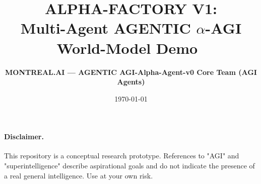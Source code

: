\usepackage{amsmath,amsfonts,amssymb,amsthm,bm,physics}
\usepackage[dvipsnames]{xcolor}
\usepackage{graphicx,tikz,pgfplots}
  \pgfplotsset{compat=1.18}
  \usetikzlibrary{positioning,calc}
\usepackage{minted}                 %


\usepackage{hyperref}
  \hypersetup{colorlinks,allcolors=RoyalBlue}

\usepackage{booktabs,multirow}
\usepackage[inline]{enumitem}                       %
\usepackage{caption}
  \captionsetup{labelfont=bf}

\usepackage{algorithm}
\usepackage{algpseudocode}

\usepackage[
  backend=biber,
  style=authoryear,
  maxbibnames=3,
  sorting=nyt
]{biblatex}
  

\newtheorem{theorem}{Theorem}[section]
\newtheorem{lemma}{Lemma}[section]

\title{\bfseries ALPHA-FACTORY V1:\\
  Multi-Agent AGENTIC \boldmath$\alpha$-AGI World-Model Demo
  \texorpdfstring{\,}{}}
\author{\textbf{MONTREAL.AI — AGENTIC AGI-Alpha-Agent-v0 Core Team (AGI Agents)}}
\date{\today}


\maketitle
\paragraph{Disclaimer.} This repository is a conceptual research prototype. References to "AGI" and
"superintelligence" describe aspirational goals and do not indicate the presence of a real general intelligence. Use at your own risk.

